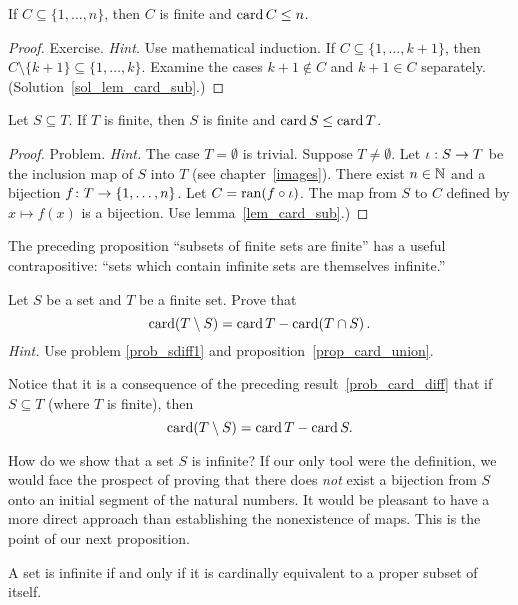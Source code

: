 \begin{lem}\label{lem_card_sub} If $C \subseteq \{1,\dots,n\}$, then $C$ is finite and
$\operatorname{card} C \le n$.
\end{lem}

\begin{proof} Exercise. \emph{Hint.}  Use mathematical induction.  If $C \subseteq
\{1,\dots,k + 1\}$, then $C \setminus \{k + 1\} \subseteq \{1,\dots,k\}$.  Examine the cases
$k + 1 \notin C$ and $k + 1 \in C$ separately.  (Solution~\ref{sol_lem_card_sub}.)  \ns
\end{proof}

\begin{prop}\label{prop_card_sub}  Let $S \subseteq T$.  If $T$ is finite, then $S$ is finite
and $\operatorname{card} S \le \operatorname{card} T$.
\end{prop}

\begin{proof} Problem.  \emph{Hint.}   The case $T = \emptyset$ is trivial. Suppose $T \ne
\emptyset$.  Let $\iota:S \rightarrow T$ be the inclusion map of $S$ into $T$ (see
chapter~\ref{images}). There exist $n \in \mathbb{N}$ and a bijection $f \colon T \rightarrow \{1,\dots,n\}$.
Let $C = \operatorname{ran}(f \circ\iota)$. The map from $S$ to $C$ defined by $x \mapsto f(x)$ is a
bijection. Use lemma~\ref{lem_card_sub}.) \ns
\end{proof}

The preceding proposition ``subsets of finite sets are finite'' has a useful contrapositive:
``sets which contain infinite sets are themselves infinite.''

\begin{prob}\label{prob_card_diff}  Let $S$ be a set and $T$ be a finite set. Prove that
  \[ \operatorname{card} (T \setminus S) = \operatorname{card} T - \operatorname{card} (T \cap S)\,. \]
\emph{Hint.}  Use problem \ref{prob_sdiff1} and proposition~\ref{prop_card_union}.
\end{prob}

Notice that it is a consequence of the preceding result~\ref{prob_card_diff} that if $S
\subseteq T$ (where $T$ is finite), then
\[\operatorname{card} (T \setminus S)  = \operatorname{card} T - \operatorname{card} S.\]

How do we show that a set $S$ is infinite?  If our only tool were the definition, we would
face the prospect of proving that there does \emph{not} exist a bijection from $S$ onto an
initial segment of the natural numbers.  It would be pleasant to have a more direct approach
than establishing the nonexistence of maps.  This is the point of our next proposition.

\begin{prop}\label{prop_ce_sub}  A set is infinite if and only if it is cardinally equivalent
to a proper subset of itself.
\end{prop}

